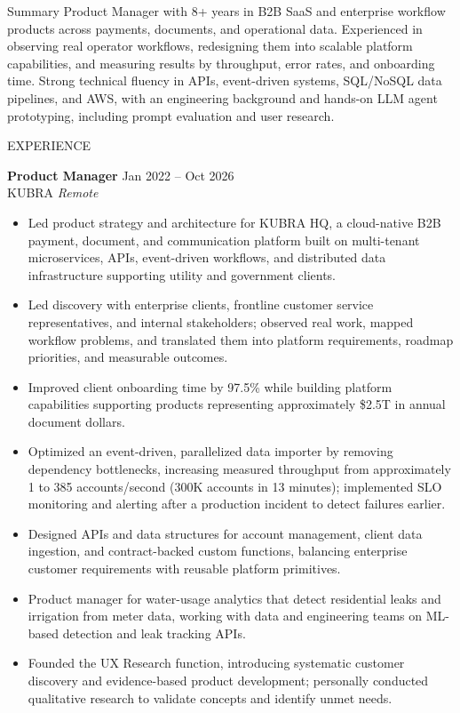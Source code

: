 \documentclass{resume}
\begin{document}
\begin{rSection}{Summary}
Product Manager with 8+ years in B2B SaaS and enterprise workflow products across payments, documents, and operational data. Experienced in observing real operator workflows, redesigning them into scalable platform capabilities, and measuring results by throughput, error rates, and onboarding time. Strong technical fluency in APIs, event-driven systems, SQL/NoSQL data pipelines, and AWS, with an engineering background and hands-on LLM agent prototyping, including prompt evaluation and user research.
\end{rSection}

\begin{rSection}{EXPERIENCE}

\textbf{Product Manager} \hfill Jan 2022 -- Oct 2026\\
KUBRA \hfill \textit{Remote}
\begin{itemize}
\itemsep -3pt
\item Led product strategy and architecture for KUBRA HQ, a cloud-native B2B payment, document, and communication platform built on multi-tenant microservices, APIs, event-driven workflows, and distributed data infrastructure supporting utility and government clients.
\item Led discovery with enterprise clients, frontline customer service representatives, and internal stakeholders; observed real work, mapped workflow problems, and translated them into platform requirements, roadmap priorities, and measurable outcomes.
\item Improved client onboarding time by 97.5\% while building platform capabilities supporting products representing approximately \$2.5T in annual document dollars.
\item Optimized an event-driven, parallelized data importer by removing dependency bottlenecks, increasing measured throughput from approximately 1 to 385 accounts/second (300K accounts in 13 minutes); implemented SLO monitoring and alerting after a production incident to detect failures earlier.
\item Designed APIs and data structures for account management, client data ingestion, and contract-backed custom functions, balancing enterprise customer requirements with reusable platform primitives.
\item Product manager for water-usage analytics that detect residential leaks and irrigation from meter data, working with data and engineering teams on ML-based detection and leak tracking APIs.
\item Founded the UX Research function, introducing systematic customer discovery and evidence-based product development; personally conducted qualitative research to validate concepts and identify unmet needs.
\end{itemize}


\end{rSection}
\end{document}
